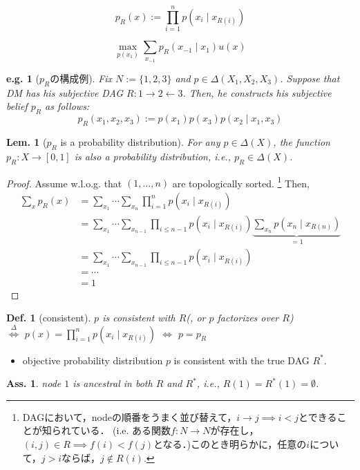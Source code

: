 \documentclass[11pt,a4paper,dvipdfmx]{article}
\theoremstyle{plain}
\newtheorem{lem}{Lem.}[section]
\newtheorem{df}{Def.}[section]
\newtheorem{eg}{e.g.}[section]
\newtheorem{ass}{Ass.}[section]
\newcommand{\defi}{\stackrel{\Delta}{\Longleftrightarrow}}
\newcommand{\equi}{\Longleftrightarrow}
\begin{document}
$$p_R(x) := \prod_{i=1}^n p(x_i \mid x_{R(i)})$$

$$\max_{p(x_1)} \sum_{x_{-1}} p_R(x_{-1} \mid x_1) u(x)$$

\begin{eg}[$p_R$の構成例]
	Fix $N:=\{1,2,3\}$ and $p \in \Delta(X_1, X_2, X_3)$. Suppose that DM has his subjective DAG $R: 1 \rightarrow 2 \leftarrow 3$.	Then, he constructs his subjective belief $p_R$ as follows:
	$$
	p_R(x_1, x_2, x_3) := p(x_1) p(x_3) p(x_2 \mid x_1, x_3)
	$$
\end{eg}

\begin{lem}[$p_R$ is a probability distribution]
	For any $p \in \Delta(X)$, the function $p_R: X \to [0,1]$ is also a probability distribution, i.e., $p_R \in \Delta(X)$.
\end{lem}
\begin{proof}
	Assume w.l.o.g. that $(1, \dots, n)$ are topologically sorted.
	\footnote{
	DAGにおいて，nodeの順番をうまく並び替えて，$i \rightarrow j \implies i < j$とできることが知られている．
	(i.e. ある関数$f: N \to N$が存在し，$(i, j) \in R \implies f(i) < f(j)$となる．)このとき明らかに，任意の$i$について，$j > i$ならば，$j \notin R(i)$.
	}
	Then, 
	\begin{align*}
		\sum_x p_R(x) &= \sum_{x_1} \cdots \sum_{x_n} \prod_{i=1}^n p(x_i \mid x_{R(i)}) \\
		&= \sum_{x_1} \cdots \sum_{x_{n-1}} \prod_{i \leq n-1} p(x_i \mid x_{R(i)}) \underbrace{\sum_{x_n} p(x_n \mid x_{R(n)})}_{=1} \\
		&=  \sum_{x_1} \cdots \sum_{x_{n-1}} \prod_{i \leq n-1} p(x_i \mid x_{R(i)}) \\
		&= \cdots \\
		&= 1
	\end{align*}
\end{proof}

\begin{df}[consistent]
	$p$ is consistent with $R$(, or $p$ factorizes over $R$) \\
	$\defi$ $p(x) = \prod_{i=1}^n p(x_i \mid x_{R(i)})$
	$\equi$ $p = p_R$
\end{df}

\begin{itemize}
	\item objective probability distribution $p$ is consistent with the true DAG $R^*$.
\end{itemize}

\begin{ass}
	node $1$ is ancestral in both $R$ and $R^*$, i.e., $R(1) = R^*(1) = \emptyset$.
\end{ass}
\end{document}
